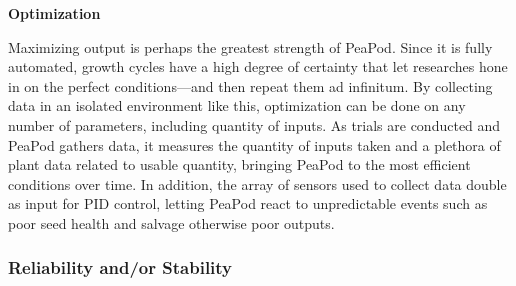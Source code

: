 \documentclass{report}
\begin{document}


\textbf{Optimization}

Maximizing output is perhaps the greatest strength of PeaPod. Since it is fully automated, growth cycles have a high degree of certainty that let researches hone in on the perfect conditions---and then repeat them ad infinitum.
By collecting data in an isolated environment like this, optimization can be done on any number of parameters, including quantity of inputs. As trials are conducted and PeaPod gathers data, it measures the quantity of inputs taken and a plethora of plant data related to usable quantity, bringing PeaPod to the most efficient conditions over time.
In addition, the array of sensors used to collect data double as input for PID control, letting PeaPod react to unpredictable events such as poor seed health and salvage otherwise poor outputs.

\subsubsection{Reliability and/or Stability}
\end{document}
